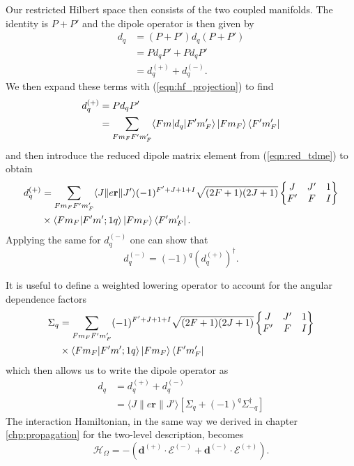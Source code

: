     Our restricted Hilbert space then consists of the two coupled manifolds. The
    identity is $P + P'$ and the dipole operator is then given by
    \begin{align}
      d_q &= (P + P') d_q (P + P') \\
          &= P d_q P' + P d_q P' \\
          &= d_q^{(+)} + d_q^{(-)}.
    \end{align}
    We then expand these terms with (\ref{eqn:hf_projection}) to find
    \begin{align}
      d^{(+)}_q &= P d_q P' \nonumber \\
      &= \sum_{F m_F F' m'_F} \langle F m | d_q | F' m'_F 
        \rangle \Ket{F m_F} \Bra{F' m'_F}
    \end{align}
    and then introduce the reduced dipole matrix element from (\ref{eqn:red_tdme})
    to obtain
    \begin{align}
      d^{(+)}_q &= \sum_{F m_F F' m'_F} \langle J  \| e \mathbf{r} \| J' \rangle 
      (-1)^{F' + J + 1 + I} \sqrt{(2F + 1)(2J + 1)} 
      \begin{Bmatrix}
        J & J' & 1 \\
        F' & F & I 
      \end{Bmatrix} \nonumber \\
      & \times \langle F m_F | F' m'; 1 q \rangle \Ket{F m_F} \Bra{F' m'_F}.
    \end{align}
    Applying the same for $d_q^{(-)}$ one can show that
    \begin{equation}
      d^{(-)}_q = (-1)^q (d_q^{(+)})^\dag.
    \end{equation}

    It is useful to define a weighted lowering operator to account for the
    angular dependence factors
    \begin{align}
      \Sigma_q &= \sum_{F m_F F' m'_F} (-1)^{F' + J + 1 + I}
        \sqrt{(2F + 1)(2J + 1)} 
        \begin{Bmatrix}
          J & J' & 1 \\
          F' & F & I 
        \end{Bmatrix} \nonumber \\
        & \times \langle F m_F | F' m'; 1 q \rangle \Ket{F m_F} \Bra{F' m'_F}
    \end{align}
    which then allows us to write the dipole operator as 
    \begin{align}
      d_q &= d_q^{(+)} + d_q^{(-)} \nonumber \\
          &= \langle J  \| e \mathbf{r} \| J' \rangle \left[ \Sigma_q + 
            (-1)^q \Sigma_{-q}^\dag \right]
    \end{align}
    The interaction Hamiltonian, in the same way we derived in chapter \ref{chp:propagation} for the two-level description, becomes
    \begin{equation}
      \mathcal{H}_\Omega = - \left( \mathbf{d}^{(+)} \cdot \mathcal{E}^{(-)} + 
        \mathbf{d}^{(-)} \cdot \mathcal{E}^{(+)} \right).
    \end{equation}


